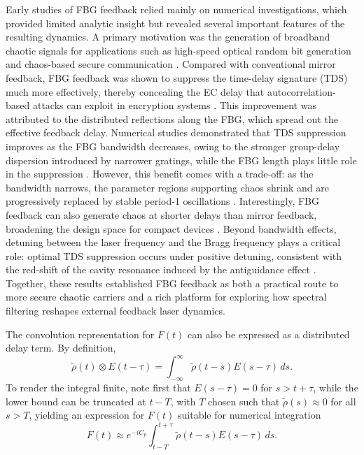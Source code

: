 %
Early studies of FBG feedback relied mainly on numerical investigations, which provided limited analytic insight but revealed several important features of the resulting dynamics. 
A primary motivation was the generation of broadband chaotic signals for applications such as high-speed optical random bit generation \cite{uchida2008fast} and chaos-based secure communication \cite{annovazzi2008secure}. 
Compared with conventional mirror feedback, FBG feedback was shown to suppress the time-delay signature (TDS) much more effectively, thereby concealing the EC delay that autocorrelation-based attacks can exploit in encryption systems \cite{li2012distributed, jiang2021characterizing}. 
This improvement was attributed to the distributed reflections along the FBG, which spread out the effective feedback delay. 
Numerical studies demonstrated that TDS suppression improves as the FBG bandwidth decreases, owing to the stronger group-delay dispersion introduced by narrower gratings, while the FBG length plays little role in the suppression \cite{li2012distributed}. 
However, this benefit comes with a trade-off: as the bandwidth narrows, the parameter regions supporting chaos shrink and are progressively replaced by stable period-1 oscillations \cite{li2020stable}. 
Interestingly, FBG feedback can also generate chaos at shorter delays than mirror feedback, broadening the design space for compact devices \cite{li2012distributed}. 
Beyond bandwidth effects, detuning between the laser frequency and the Bragg frequency plays a critical role: optimal TDS suppression occurs under positive detuning, consistent with the red-shift of the cavity resonance induced by the antiguidance effect \cite{li2015chaotic}. 
Together, these results established FBG feedback as both a practical route to more secure chaotic carriers and a rich platform for exploring how spectral filtering reshapes external feedback laser dynamics.
%
\par
%
The convolution representation for $F(t)$ can also be expressed as a distributed delay term. 
By definition,
\begin{equation*}
\tilde{\rho}(t) \otimes E(t-\tau) = \int_{-\infty}^{\infty} \tilde{\rho}(t-s) E(s-\tau)\,ds.
\end{equation*}
%
To render the integral finite, note first that $E(s-\tau) = 0$ for $s > t+\tau$, while the lower bound can be truncated at $t-T$, with $T$ chosen such that $\tilde{\rho}(s) \approx 0$ for all $s > T$, yielding an expression for $F(t)$ suitable for numerical integration
%
\begin{equation}
    \label{eq:distributed}
F(t) \approx e^{-i C_p} \int_{t-T}^{t+\tau} \tilde{\rho}(t-s) E(s-\tau)\,ds.
\end{equation}
